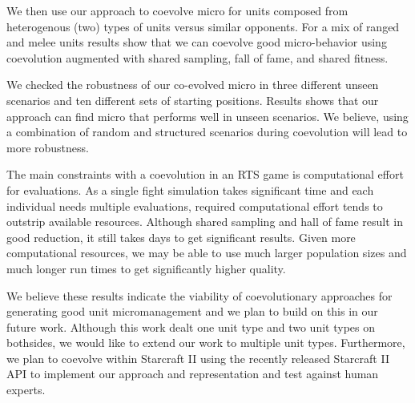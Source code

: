 \documentclass[conference,10pt]{IEEEtran}
\begin{document}
We then use our approach to coevolve micro for units composed from heterogenous (two) types of units
versus similar opponents. For a mix of ranged and melee units results show that we can
coevolve good micro-behavior using coevolution augmented with shared sampling, fall of fame, and shared fitness. 

We checked the robustness of our co-evolved micro in three different unseen scenarios and ten
different sets of starting positions. Results shows that our approach
can find micro that performs well in unseen scenarios. We believe,
using a combination of random and structured scenarios during
coevolution will lead to more robustness.
 
The main constraints with a coevolution in an RTS game is
computational effort for evaluations. As a single fight simulation
takes significant time and each individual needs multiple evaluations,
required computational effort tends to outstrip available
resources. Although shared sampling and hall of fame result in good
reduction, it still takes days to get significant results. Given more
computational resources, we may be able to use much larger population
sizes and much longer run times to get significantly higher quality.

We believe these results indicate the viability of coevolutionary
approaches for generating good unit micromanagement and we plan to
build on this in our future work. Although this work dealt one unit type and two unit types on bothsides, we would like to extend our work to multiple unit types. Furthermore, we plan to coevolve within Starcraft II using the recently released Starcraft II API to implement our approach and representation and test against human experts. 


%

\balance

%
\end{document}
